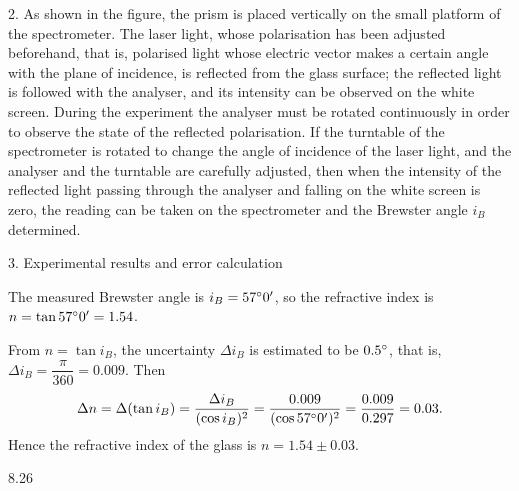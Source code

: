 2. As shown in the figure, the prism is placed vertically on the small platform of the spectrometer. The laser light, whose polarisation has been adjusted beforehand, that is, polarised light whose electric vector makes a certain angle with the plane of incidence, is reflected from the glass surface; the reflected light is followed with the analyser, and its intensity can be observed on the white screen. During the experiment the analyser must be rotated continuously in order to observe the state of the reflected polarisation. If the turntable of the spectrometer is rotated to change the angle of incidence of the laser light, and the analyser and the turntable are carefully adjusted, then when the intensity of the reflected light passing through the analyser and falling on the white screen is zero, the reading can be taken on the spectrometer and the Brewster angle $i_B$ determined.

3. Experimental results and error calculation

The measured Brewster angle is $i_B=57^{\circ}0'$, so the refractive index is $n=\tan57^{\circ}0'=1.54$.

From $n=\tan i_B$, the uncertainty $\Delta i_B$ is estimated to be $0.5^{\circ}$, that is, $\Delta i_B=\dfrac{\pi}{360}=0.009$. Then
\[
\Delta n=\Delta(\tan i_B)=\frac{\Delta i_B}{(\cos i_B)^2}
=\frac{0.009}{(\cos57^{\circ}0')^2}=\frac{0.009}{0.297}=0.03.
\]
Hence the refractive index of the glass is $n=1.54\pm0.03$.

\begin{figbox}{8.26}
\end{figbox}
